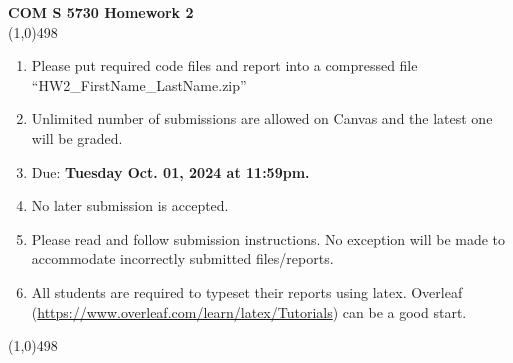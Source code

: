\documentclass[11pt]{article}
\begin{document}
\begin{center}
{\Large \textbf{COM S 5730 Homework 2}}\\

\linethickness{1mm}\line(1,0){498}

\begin{enumerate}
\item Please put required code files and report into a
compressed file ``HW2\_FirstName\_LastName.zip''
\item Unlimited number of submissions are
allowed on Canvas and the latest one will be graded.
\item Due: \textbf{Tuesday Oct. 01, 2024 at 11:59pm.}
\item {\color{red} No later submission is accepted.}
\item Please read and follow submission instructions. No exception
will be made to accommodate incorrectly submitted files/reports.
\item All students are required to typeset their reports using
latex. Overleaf
(\url{https://www.overleaf.com/learn/latex/Tutorials}) can be a
good start.
\end{enumerate}

\linethickness{1mm}\line(1,0){498}

\end{center}


\end{document}
